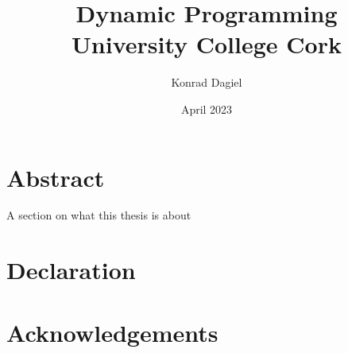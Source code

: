 \documentclass{report}
\title{\textbf{Dynamic Programming} \\
\Large{University College Cork}}
\author{Konrad Dagiel}
\date{April 2023}
\begin{document}
\maketitle

\chapter*{Abstract}
A section on what this thesis is about

\chapter*{Declaration}

\chapter*{Acknowledgements}

\tableofcontents
\end{document}
